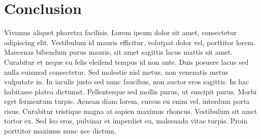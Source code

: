 \section{Conclusion}

Vivamus aliquet pharetra facilisis. Lorem ipsum dolor sit amet, consectetur adipiscing elit. Vestibulum id mauris efficitur, volutpat dolor vel, porttitor lorem. Maecenas bibendum purus mauris, sit amet sagittis lacus mattis sit amet. Curabitur et neque eu felis eleifend tempus id non ante. Duis posuere lacus sed nulla euismod consectetur. Sed molestie nisl metus, non venenatis metus vulputate in. In iaculis justo sed nunc faucibus, non auctor eros sagittis. In hac habitasse platea dictumst. Pellentesque sed mollis purus, ut suscipit purus. Morbi eget fermentum turpis. Aenean diam lorem, cursus eu enim vel, interdum porta risus. Curabitur tristique magna at sapien maximus rhoncus. Vestibulum sit amet tortor ex. Sed leo eros, pulvinar et imperdiet eu, malesuada vitae turpis. Proin porttitor maximus nunc nec dictum.
